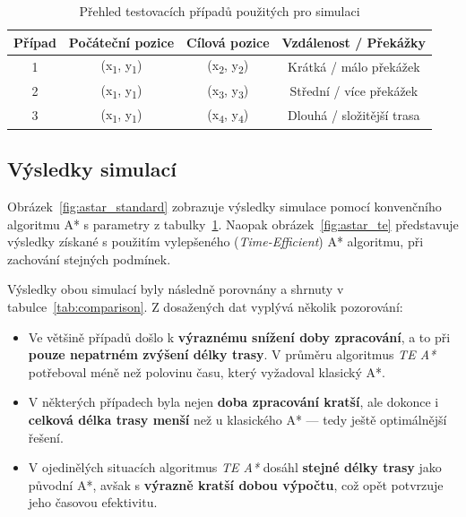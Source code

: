 \documentclass[10pt, a4paper]{article}
\begin{document}
\begin{table}[H]
\centering
\caption{Přehled testovacích případů použitých pro simulaci}
\label{tab:testcases}
\begin{tabular}{|c|c|c|c|}
\hline
\textbf{Případ} & \textbf{Počáteční pozice} & \textbf{Cílová pozice} & \textbf{Vzdálenost / Překážky} \\ \hline
1 & (x\textsubscript{1}, y\textsubscript{1}) & (x\textsubscript{2}, y\textsubscript{2}) & Krátká / málo překážek \\ \hline
2 & (x\textsubscript{1}, y\textsubscript{1}) & (x\textsubscript{3}, y\textsubscript{3}) & Střední / více překážek \\ \hline
3 & (x\textsubscript{1}, y\textsubscript{1}) & (x\textsubscript{4}, y\textsubscript{4}) & Dlouhá / složitější trasa \\ \hline
\end{tabular}
\end{table}

\subsection{Výsledky simulací}

Obrázek~\ref{fig:astar_standard} zobrazuje výsledky simulace pomocí konvenčního algoritmu A* s parametry z tabulky~\ref{tab:testcases}.
Naopak obrázek~\ref{fig:astar_te} představuje výsledky získané s použitím vylepšeného (\textit{Time-Efficient}) A* algoritmu, při zachování stejných podmínek.

Výsledky obou simulací byly následně porovnány a shrnuty v tabulce~\ref{tab:comparison}.
Z dosažených dat vyplývá několik pozorování:

\begin{itemize}
    \item Ve většině případů došlo k \textbf{výraznému snížení doby zpracování}, a to při \textbf{pouze nepatrném zvýšení délky trasy}.
    V průměru algoritmus \textit{TE A*} potřeboval méně než polovinu času, který vyžadoval klasický A*.

    \item V některých případech byla nejen \textbf{doba zpracování kratší}, ale dokonce i \textbf{celková délka trasy menší} než u klasického A* — tedy ještě optimálnější řešení.

    \item V ojedinělých situacích algoritmus \textit{TE A*} dosáhl \textbf{stejné délky trasy} jako původní A*, avšak s \textbf{výrazně kratší dobou výpočtu}, což opět potvrzuje jeho časovou efektivitu.
\end{itemize}
\end{document}
